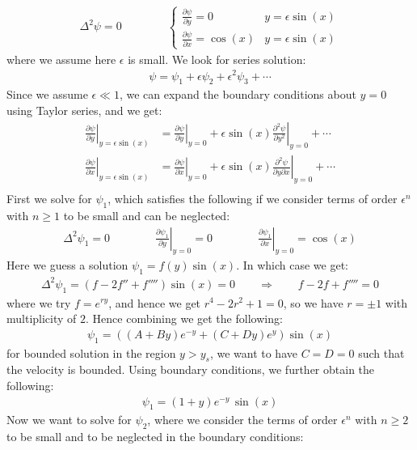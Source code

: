 \documentclass[11pt]{book}
\theoremstyle{break}
\theoremstyle{break}
\newcommand{\pd}{\partial}
\begin{document}
\begin{align*}
\Delta^2 \psi = 0 \qquad\qquad\begin{cases} 
\frac{\pd \psi}{\pd y}= 0 & y=\epsilon \sin(x)\\
\frac{\pd \psi}{\pd x} = \cos(x) & y = \epsilon \sin(x)
\end{cases}
\end{align*}
where we assume here $\epsilon$ is small. We look for series solution:
\begin{align*}
\psi = \psi_1 + \epsilon \psi_2 + \epsilon^2\psi_3 + \cdots
\end{align*}
Since we assume $\epsilon\ll 1$, we can expand the boundary conditions about $y=0$ using Taylor series, and we get:
\begin{align*}
\left.\frac{\pd \psi}{\pd y}\right|_{y = \epsilon \sin(x)} &= \left.\frac{\pd \psi}{\pd y}\right|_{y=0} + \epsilon\sin(x) \left.\frac{\pd^2 \psi}{\pd y^2}\right|_{y=0} + \cdots\\
\left.\frac{\pd \psi}{\pd x}\right|_{y = \epsilon \sin(x)} &= \left.\frac{\pd \psi}{\pd x}\right|_{y=0} + \epsilon\sin(x) \left.\frac{\pd^2 \psi}{\pd y\pd x}\right|_{y=0} + \cdots\\
\end{align*}
First we solve for $\psi_1$, which satisfies the following if we consider terms of order $\epsilon^n$ with $n\geq 1$ to be small and can be neglected:
\begin{align*}
\Delta^2 \psi_1 = 0 \qquad\qquad \left.\frac{\pd \psi_1}{\pd y}\right|_{y=0} = 0 \qquad\qquad
\left.\frac{\pd \psi_1}{\pd x}\right|_{y=0} = \cos(x)
\end{align*}
Here we guess a solution $\psi_1 = f(y) \sin(x)$. In which case we get:
\begin{align*}
\Delta^2 \psi_1 = (f-2f''+f'''')\sin(x) = 0 \qquad \Rightarrow \qquad f-2f+f'''' = 0
\end{align*}
where we try $f = e^{ry}$, and hence we get $r^4 - 2r^2 + 1 = 0$, so we have $r = \pm 1$ with multiplicity of $2$. Hence combining we get the following:
\begin{align*}
\psi_1 = \left((A+By)e^{-y} + (C+Dy)e^y \right)\sin(x)
\end{align*}
for bounded solution in the region $y > y_s$, we want to have $C=D =0$ such that the velocity is bounded. Using boundary conditions, we further obtain the following:
\begin{align*}
\psi_1 = (1+y)e^{-y}\, \sin(x)
\end{align*}
Now we want to solve for $\psi_2$, where we consider the terms of order $\epsilon^n$ with $n \geq 2$ to be small and to be neglected in the boundary conditions:
\end{document}
